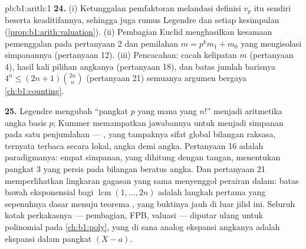 \begin{solution}{pb:b1:arith:1}
\textbf{24.} (i) Ketunggalan pemfaktoran melandasi definisi
$v_p$ itu sendiri beserta keaditifannya, sehingga juga rumus Legendre
dan setiap kesimpulan 
(\cref{prop:b1:arith:valuation}). (ii) Pembagian Euclid menghasilkan
kesamaan pemenggalan pada pertanyaan 2 dan pemilahan $m = p^km_1 +
m_0$ yang mengisolasi simpanannya (pertanyaan 12). (iii) Pencacahan: cacah
kelipatan $m$ (pertanyaan 4), hasil kali pilihan angkanya
(pertanyaan 18), dan batas jumlah barisnya $4^n \leq
(2n+1)\binom{2n}n$ (pertanyaan 21) semuanya argumen
bergaya \cref{ch:b1:counting}.

\textbf{25.} Legendre mengubah ``pangkat $p$ yang mana yang 
$n!$'' menjadi aritmetika angka basis $p$; Kummer memampatkan
jawabannya untuk  menjadi simpanan pada satu
penjumlahan --- , yang tampaknya sifat global bilangan raksasa,
ternyata terbaca secara lokal, angka demi angka. Pertanyaan 16 adalah
paradigmanya: empat simpanan, yang dihitung dengan tangan, menentukan pangkat
$3$ yang persis pada bilangan beratus angka. Dan pertanyaan 21
memperlihatkan lingkaran gagasan yang sama menyenggol perairan dalam: batas
bawah eksponensial bagi $\operatorname{lcm}(1, \dots, 2n)$ adalah
langkah pertama yang sepenuhnya dasar menuju teorema ,
yang buktinya jauh di luar jilid ini. Seluruh kotak perkakasnya ---
pembagian, FPB, valuasi --- diputar ulang untuk polinomial pada
\cref{ch:b1:poly}, yang di sana analog ekspansi angkanya adalah
ekspansi dalam pangkat $(X - a)$.

\end{solution}
